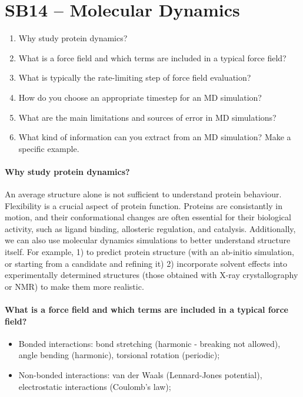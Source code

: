 \section{SB14 -- Molecular Dynamics \done}


\begin{enumerate}
\item{Why study protein dynamics? \done}
\item{What is a force field and which terms are included in a typical force field? \done}
\item{What is typically the rate-limiting step of force field evaluation? \done}
\item{How do you choose an appropriate timestep for an MD simulation? \done}
\item{What are the main limitations and sources of error in MD simulations?}
\item {What kind of information can you extract from an MD simulation? Make a specific example.}
\end{enumerate}


\paragraph{Why study protein dynamics? \done}
An average structure alone is not sufficient to understand protein behaviour. Flexibility is a crucial aspect of protein function. 
Proteins are consistantly in motion, and their conformational changes are often essential for their biological activity, such as ligand binding, allosteric regulation, and catalysis.
Additionally, we can also use molecular dynamics simulations to better understand structure itself. For example,   1) to predict protein structure (with an ab-initio simulation, or starting from a candidate and refining it) 2) incorporate solvent effects into experimentally determined structures (those obtained with X-ray crystallography or NMR) to make them more realistic.


\paragraph{What is a force field and which terms are included in a typical force field?}

\begin{itemize}
    \item Bonded interactions: bond stretching (harmonic - breaking not allowed), angle bending (harmonic), torsional rotation (periodic);
    \item Non-bonded interactions: van der Waals (Lennard-Jones potential), electrostatic interactions (Coulomb's law);
\end{itemize}

